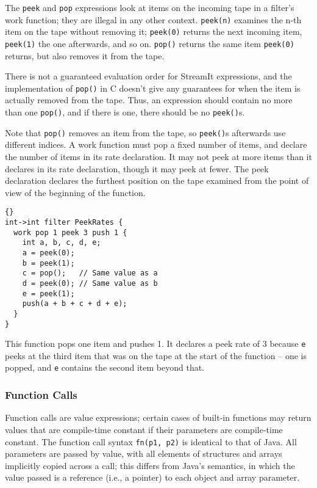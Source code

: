\documentclass[11pt]{article}
\begin{document}
The \lstinline|peek| and \lstinline|pop| expressions look at items on
the incoming tape in a filter's work function; they are illegal in any
other context.  \lstinline|peek(n)| examines the n-th item on the tape
without removing it; \lstinline|peek(0)| returns the next incoming
item, \lstinline|peek(1)| the one afterwards, and so on.
\lstinline|pop()| returns the same item \lstinline|peek(0)| returns,
but also removes it from the tape.

\begin{note}
There is not a guaranteed evaluation order for StreamIt expressions,
and the implementation of \lstinline|pop()| in C doesn't give any
guarantees for when the item is actually removed from the tape.  Thus,
an expression should contain no more than one \lstinline|pop()|, and
if there is one, there should be no \lstinline|peek()|s.
\end{note}

Note that \lstinline|pop()| removes an item from the tape, so
\lstinline|peek()|s afterwards use different indices.  A work function
must pop a fixed number of items, and declare the number of items in
its rate declaration.  It may not peek at more items than it declares
in its rate declaration, though it may peek at fewer.  The peek
declaration declares the furthest position on the tape examined from
the point of view of the beginning of the function.

\begin{lstlisting}{}
int->int filter PeekRates {
  work pop 1 peek 3 push 1 {
    int a, b, c, d, e;
    a = peek(0);
    b = peek(1);
    c = pop();   // Same value as a
    d = peek(0); // Same value as b
    e = peek(1);
    push(a + b + c + d + e);
  }
}
\end{lstlisting}

This function pops one item and pushes 1.  It declares a peek rate of
3 because \lstinline|e| peeks at the third item that was on the tape
at the start of the function -- one is popped, and \lstinline|e|
contains the second item beyond that.

\subsubsection{Function Calls}
\label{sec:expr-funcall}

Function calls are value expressions; certain cases of built-in
functions may return values that are compile-time constant if their
parameters are compile-time constant.  The function call syntax
\lstinline|fn(p1, p2)| is identical to that of Java.  All parameters
are passed by value, with all elements of structures and arrays
implicitly copied across a call; this differs from Java's semantics,
in which the value passed is a reference (i.e., a pointer) to each
object and array parameter.
\end{document}
